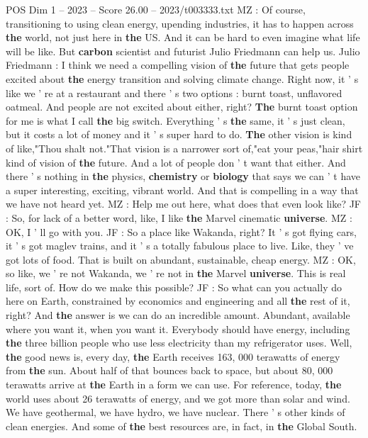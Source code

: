 \begin{textsample}{POS Dim 1 – 2023 – Score 26.00 – 2023/t003333.txt}
MZ : Of course, transitioning to using clean energy, upending industries, it has to happen across \textbf{the} world, not just here in \textbf{the} US.
And it can be hard to even imagine what life will be like.
But \textbf{carbon} scientist and futurist Julio Friedmann can help us.
Julio Friedmann : I think we need a compelling vision of \textbf{the} future that gets people excited about \textbf{the} energy transition and solving climate change.
Right now, it ' s like we ' re at a restaurant and there ' s two options : burnt toast, unflavored oatmeal.
And people are not excited about either, right? \textbf{The} burnt toast option for me is what I call \textbf{the} big switch.
Everything ' s \textbf{the} same, it ' s just clean, but it costs a lot of money and it ' s super hard to do. \textbf{The} other vision is kind of like,"Thou shalt not."That vision is a narrower sort of,"eat your peas,"hair shirt kind of vision of \textbf{the} future.
And a lot of people don ' t want that either.
And there ' s nothing in \textbf{the} physics, \textbf{chemistry} or \textbf{biology} that says we can ' t have a super interesting, exciting, vibrant world.
And that is compelling in a way that we have not heard yet.
MZ : Help me out here, what does that even look like?
JF : So, for lack of a better word, like, I like \textbf{the} Marvel cinematic \textbf{universe}.
MZ : OK, I ' ll go with you.
JF : So a place like Wakanda, right?
It ' s got flying cars, it ' s got maglev trains, and it ' s a totally fabulous place to live.
Like, they ' ve got lots of food.
That is built on abundant, sustainable, cheap energy.
MZ : OK, so like, we ' re not Wakanda, we ' re not in \textbf{the} Marvel \textbf{universe}.
This is real life, sort of.
How do we make this possible?
JF : So what can you actually do here on Earth, constrained by economics and engineering and all \textbf{the} rest of it, right?
And \textbf{the} answer is we can do an incredible amount.
Abundant, available where you want it, when you want it.
Everybody should have energy, including \textbf{the} three billion people who use less electricity than my refrigerator uses.
Well, \textbf{the} good news is, every day, \textbf{the} Earth receives 163, 000 terawatts of energy from \textbf{the} sun.
About half of that bounces back to space, but about 80, 000 terawatts arrive at \textbf{the} Earth in a form we can use.
For reference, today, \textbf{the} world uses about 26 terawatts of energy, and we got more than solar and wind.
We have geothermal, we have hydro, we have nuclear.
There ' s other kinds of clean energies.
And some of \textbf{the} best resources are, in fact, in \textbf{the} Global South.

\end{textsample}
